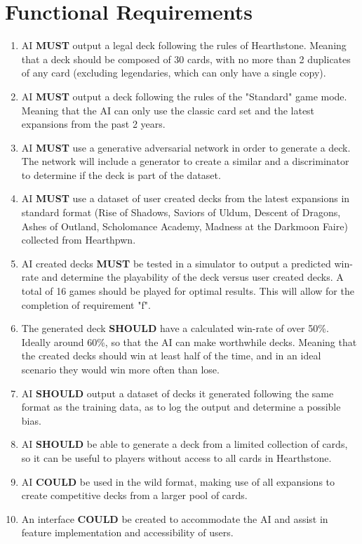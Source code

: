 \documentclass{report} %
\begin{document}
	\section{Functional Requirements}
	\begin{enumerate}
		\item{ AI \textbf{MUST} output a legal deck following the rules of Hearthstone. Meaning that a deck should be composed of 30 cards, with no more than 2 duplicates of any card (excluding legendaries, which can only have a single copy).}
		\item AI \textbf{MUST} output a deck following the rules of the "Standard" game mode. Meaning that the AI can only use the classic card set and the latest expansions from the past 2 years.
		\item AI \textbf{MUST} use a generative adversarial network in order to generate a deck. The network will include a generator to create a similar and a discriminator to determine if the deck is part of the dataset.
		\item AI \textbf{MUST} use a dataset of user created decks from the latest expansions in standard format (Rise of Shadows, Saviors of Uldum, Descent of Dragons, Ashes of Outland, Scholomance Academy, Madness at the Darkmoon Faire) collected from Hearthpwn.
		\item AI created decks \textbf{MUST} be tested in a simulator to output a predicted win-rate and determine the playability of the deck versus user created decks. A total of 16 games should be played for optimal results. This will allow for the completion of requirement "f". 
		\item The generated deck \textbf{SHOULD} have a calculated win-rate of over 50\%. Ideally around 60\%, so that the AI can make worthwhile decks. Meaning that the created decks should win at least half of the time, and in an ideal scenario they would win more often than lose.
		\item AI \textbf{SHOULD} output a dataset of decks it generated following the same format as the training data, as to log the output and determine a possible bias.
		\item AI \textbf{SHOULD} be able to generate a deck from a limited collection of cards, so it can be useful to players without access to all cards in Hearthstone.
		\item AI \textbf{COULD} be used in the wild format, making use of all expansions to create competitive decks from a larger pool of cards.
		
		\item An interface \textbf{COULD} be created to accommodate the AI and assist in feature implementation and accessibility of users. 
	\end{enumerate}
\end{document}

